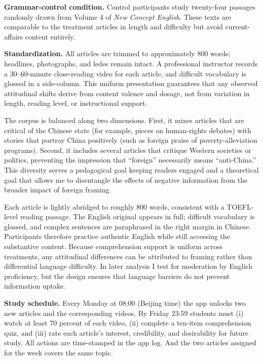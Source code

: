 \documentclass[12pt, american]{article}
\begin{document}
\textbf{Grammar-control condition.}  
Control participants study twenty-four passages randomly drawn from Volume 4 of \emph{New Concept English}.  These texts are comparable to the treatment articles in length and difficulty but avoid current-affairs content entirely.

\textbf{Standardization.}  
All articles are trimmed to approximately 800 words; headlines, photographs, and ledes remain intact.  A professional instructor records a 30–60-minute close-reading video for each article, and difficult vocabulary is glossed in a side-column.  This uniform presentation guarantees that any observed attitudinal shifts derive from content valence and dosage, not from variation in length, reading level, or instructional support.

The corpus is balanced along two dimensions.  First, it mixes articles that are critical of the Chinese state (for example, pieces on human-rights debates) with stories that portray China positively (such as foreign praise of poverty-alleviation programs).  Second, it includes several articles that critique Western societies or politics, preventing the impression that “foreign” necessarily means “anti-China.”  This diversity serves a pedagogical goal keeping readers engaged and a theoretical goal that allows me to disentangle the effects of negative information from the broader impact of foreign framing.

Each article is lightly abridged to roughly 800 words, consistent with a TOEFL-level reading passage.  The English original appears in full; difficult vocabulary is glossed, and complex sentences are paraphrased in the right margin in Chinese.  Participants therefore practice authentic English while still accessing the substantive content.  Because comprehension support is uniform across treatments, any attitudinal differences can be attributed to framing rather than differential language difficulty.  In later analysis I test for moderation by English proficiency, but the design ensures that language barriers do not prevent information uptake.



\textbf{Study schedule.} Every Monday at 08:00 (Beijing time) the app unlocks two new articles and the corresponding videos.  By Friday 23:59 students must (i) watch at least 70 percent of each video, (ii) complete a ten-item comprehension quiz, and (iii) rate each article’s interest, credibility, and desirability for future study.  All actions are time-stamped in the app log. And the two articles assigned for the week covers the same topic.
\end{document}
